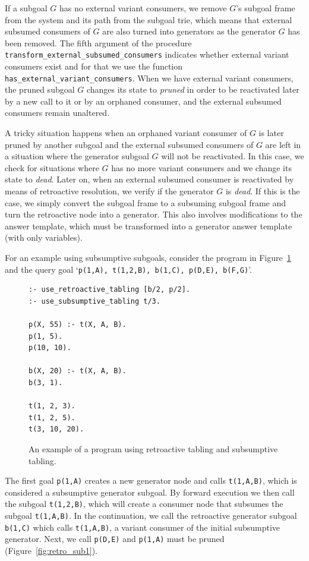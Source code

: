 If a subgoal $G$ has no external variant consumers, we remove $G$'s subgoal frame from the system and
its path from the subgoal trie, which means that external subsumed consumers of $G$ are also turned into
generators as the generator $G$ has been removed.
The fifth argument of the procedure \texttt{transform\_external\_subsumed\_consumers}
indicates whether external variant consumers exist and for that we use the function 
\texttt{has\_external\_variant\_consumers}.
When we have external variant consumers, the pruned subgoal $G$ changes its state
to \textit{pruned} in order to be reactivated later by a new call to it or by an orphaned consumer, and
the external subsumed consumers remain unaltered.

A tricky situation happens when an orphaned variant consumer of $G$ is later pruned by another subgoal and the external
subsumed consumers of $G$ are left in a situation where the generator subgoal $G$ will not be reactivated. In this case,
we check for situations where $G$ has no more variant consumers and we change its state
to \textit{dead}. Later on, when an external subsumed consumer is reactivated by means of retroactive resolution, we
verify if the generator $G$ is \textit{dead}. If this is the case, we simply convert the subgoal frame to a
subsuming subgoal frame and turn the retroactive node into a generator. This also involves modifications
to the answer template, which must be transformed into a generator answer template (with only variables).

For an example using subsumptive subgoals, consider the program in Figure~\ref{fig:retro_sub} and
the query goal `\texttt{p(1,A),~t(1,2,B),~b(1,C),~p(D,E),~b(F,G)}'.

\begin{figure}[ht]
\begin{Verbatim}
:- use_retroactive_tabling [b/2, p/2].
:- use_subsumptive_tabling t/3.

p(X, 55) :- t(X, A, B).
p(1, 5).
p(10, 10).

b(X, 20) :- t(X, A, B).
b(3, 1).

t(1, 2, 3).
t(1, 2, 5).
t(3, 10, 20).
\end{Verbatim}
\caption{An example of a program using retroactive tabling and subsumptive tabling.}
\label{fig:retro_sub}
\end{figure}

The first goal \texttt{p(1,A)} creates a new generator node and calls \texttt{t(1,A,B)}, which is considered
a subsumptive generator subgoal. By forward execution we then call the subgoal \texttt{t(1,2,B)}, which will create
a consumer node that subsumes the subgoal \texttt{t(1,A,B)}. In the continuation, we call the retroactive generator
subgoal \texttt{b(1,C)} which calls \texttt{t(1,A,B)}, a variant consumer of the initial subsumptive generator.
Next, we call \texttt{p(D,E)} and \texttt{p(1,A)} must be pruned (Figure~\ref{fig:retro_sub1}).

